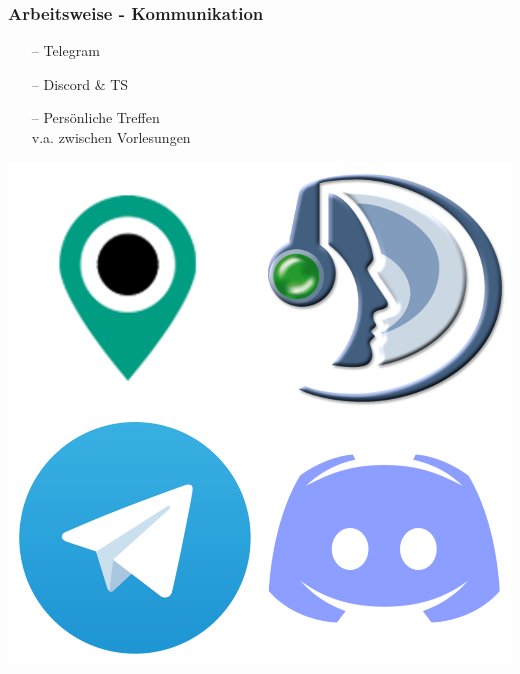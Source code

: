 \documentclass[aspectratio=1610]{beamer}
\begin{document}
  \begin{frame}[plain]
      \frametitle{\textbf{Arbeitsweise - Kommunikation}}
      \begin{minipage}{0.45\textwidth}
        \begin{itemize}
          \item[--] Telegram
          \item[--] Discord \& TS
          \item[--] Persönliche Treffen \\ v.a. zwischen Vorlesungen
        \end{itemize}
      \end{minipage}
      \begin{minipage}{0.45\textwidth}
        \includegraphics[width = \columnwidth - 30pt]
          {images/meet-im-voip.png}
      \end{minipage}
  \end{frame}
\end{document}
